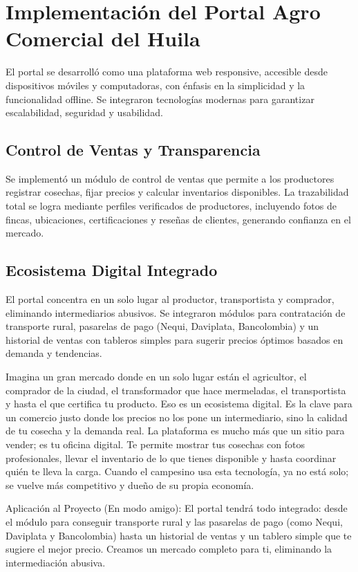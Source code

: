 \section{Implementación del Portal Agro Comercial del Huila}

El portal se desarrolló como una plataforma web responsive, accesible desde dispositivos móviles y computadoras, con énfasis en la simplicidad y la funcionalidad offline. Se integraron tecnologías modernas para garantizar escalabilidad, seguridad y usabilidad.

\subsection{Control de Ventas y Transparencia}
Se implementó un módulo de control de ventas que permite a los productores registrar cosechas, fijar precios y calcular inventarios disponibles. La trazabilidad total se logra mediante perfiles verificados de productores, incluyendo fotos de fincas, ubicaciones, certificaciones y reseñas de clientes, generando confianza en el mercado.

\subsection{Ecosistema Digital Integrado}
El portal concentra en un solo lugar al productor, transportista y comprador, eliminando intermediarios abusivos. Se integraron módulos para contratación de transporte rural, pasarelas de pago (Nequi, Daviplata, Bancolombia) y un historial de ventas con tableros simples para sugerir precios óptimos basados en demanda y tendencias.

Imagina un gran mercado donde en un solo lugar están el agricultor, el comprador de la ciudad, el transformador que hace mermeladas, el transportista y hasta el que certifica tu producto. Eso es un ecosistema digital. Es la clave para un comercio justo donde los precios no los pone un intermediario, sino la calidad de tu cosecha y la demanda real. La plataforma es mucho más que un sitio para vender; es tu oficina digital. Te permite mostrar tus cosechas con fotos profesionales, llevar el inventario de lo que tienes disponible y hasta coordinar quién te lleva la carga. Cuando el campesino usa esta tecnología, ya no está solo; se vuelve más competitivo y dueño de su propia economía.

Aplicación al Proyecto (En modo amigo): El portal tendrá todo integrado: desde el módulo para conseguir transporte rural y las pasarelas de pago (como Nequi, Daviplata y Bancolombia) hasta un historial de ventas y un tablero simple que te sugiere el mejor precio. Creamos un mercado completo para ti, eliminando la intermediación abusiva.

